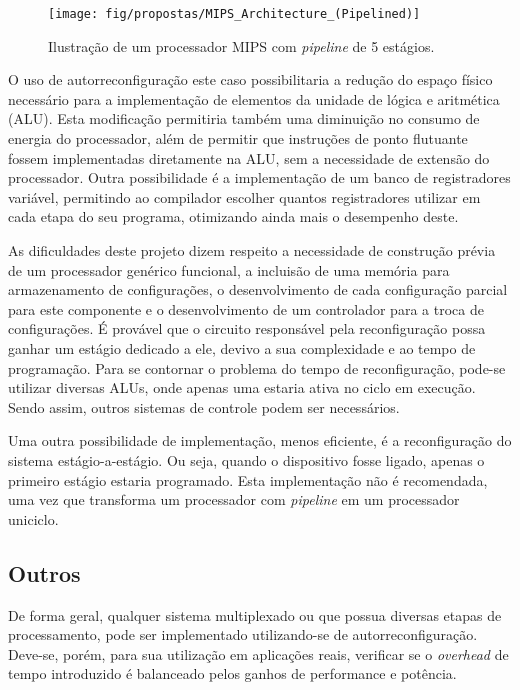 \documentclass[11pt,a4paper,oneside]{book}
\begin{document}
\begin{figure}[h]
\centering
\texttt{[image: fig/propostas/MIPS\_Architecture\_(Pipelined)]}
\caption{Ilustração de um processador MIPS com \textit{pipeline} de 5 estágios.}
\label{fig:mips}
\end{figure}

O uso de autorreconfiguração este caso possibilitaria a redução do espaço físico necessário para a implementação de elementos da unidade de lógica e aritmética (ALU).
Esta modificação permitiria também uma diminuição no consumo de energia do processador, além de permitir que instruções de ponto flutuante fossem implementadas diretamente na ALU, sem a necessidade de extensão do processador.
Outra possibilidade é a implementação de um banco de registradores variável, permitindo ao compilador escolher quantos registradores utilizar em cada etapa do seu programa, otimizando ainda mais o desempenho deste.

As dificuldades deste projeto dizem respeito a necessidade de construção prévia de um processador genérico funcional, a incluisão de uma memória para armazenamento de configurações, o desenvolvimento de cada configuração parcial para este componente e o desenvolvimento de um controlador para a troca de configurações.
É provável que o circuito responsável pela reconfiguração possa ganhar um estágio dedicado a ele, devivo a sua complexidade e ao tempo de programação.
Para se contornar o problema do tempo de reconfiguração, pode-se utilizar diversas ALUs, onde apenas uma estaria ativa no ciclo em execução.
Sendo assim, outros sistemas de controle podem ser necessários.

Uma outra possibilidade de implementação, menos eficiente, é a reconfiguração do sistema estágio-a-estágio.
Ou seja, quando o dispositivo fosse ligado, apenas o primeiro estágio estaria programado.
Esta implementação não é recomendada, uma vez que transforma um processador com \textit{pipeline} em um processador uniciclo.

\subsection{Outros}
De forma geral, qualquer sistema multiplexado ou que possua diversas etapas de processamento, pode ser implementado utilizando-se de autorreconfiguração.
Deve-se, porém, para sua utilização em aplicações reais, verificar se o \textit{overhead} de tempo introduzido é balanceado pelos ganhos de performance e potência.
\end{document}
